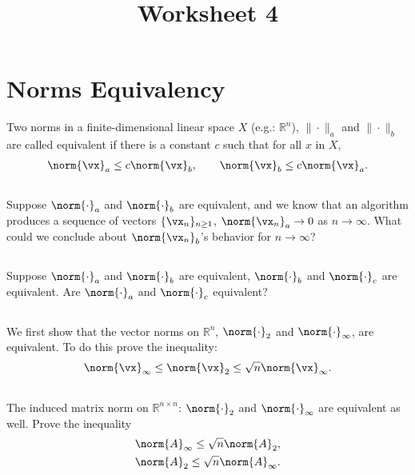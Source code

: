 \documentclass{article}%
\title{\huge Worksheet 4\\
\normalsize}
\begin{document}
\maketitle

\section{Norms Equivalency}
Two norms in a finite-dimensional linear space $X$ (e.g.: $\mathbb{R}^n$), $\|\cdot\|_a$ and $\|\cdot\|_b$ are called equivalent if there is a constant $c$ such that for all $x$ in $X$,
\begin{align}
    \norm{\vx}_a\leq c\norm{\vx}_b,\qquad \norm{\vx}_b\leq c\norm{\vx}_a.
\end{align}


\subsection{}
Suppose $\norm{\cdot}_a$ and $\norm{\cdot}_b$ are equivalent, and we know that an algorithm produces a sequence of vectors $\{\vx_n\}_{n\geq 1}$, $\norm{\vx_n}_a\to 0$ as $n\to\infty$. What could we conclude about $\norm{\vx_n}_b$'s behavior for $n\to\infty$?

\subsection{}
Suppose $\norm{\cdot}_a$ and $\norm{\cdot}_b$ are equivalent, $\norm{\cdot}_b$ and $\norm{\cdot}_c$ are equivalent. Are $\norm{\cdot}_a$ and $\norm{\cdot}_c$ equivalent?

\subsection{}
We first show that the vector norms on $\mathbb{R}^n$, $\norm{\cdot}_{2}$ and $\norm{\cdot}_{\infty}$, are equivalent. To do this prove the inequality:
\begin{align*}
    \norm{\vx}_\infty \leq \norm{\vx}_2 \leq \sqrt{n}\norm{\vx}_\infty.
\end{align*}

\subsection{}
The induced matrix norm on $\mathbb{R}^{n\times n}$: $\norm{\cdot}_{2}$ and $\norm{\cdot}_{\infty}$ are equivalent as well. Prove the inequality
\begin{align*}
    &\norm{A}_\infty \leq \sqrt{n}\norm{ A}_2,\\
    &\norm{ A}_2 \leq \sqrt{n}\norm{ A}_\infty.
\end{align*}
\end{document}
